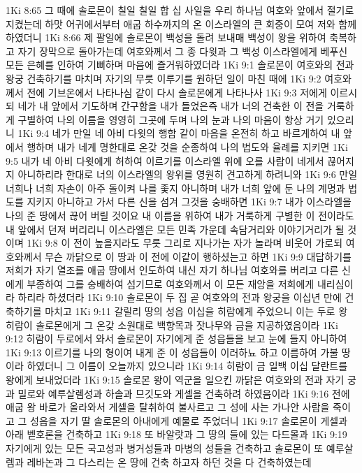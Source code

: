 1Ki 8:65  그 때에 솔로몬이 칠일 칠일 합 십 사일을 우리 하나님 여호와 앞에서 절기로 지켰는데 하맛 어귀에서부터 애굽 하수까지의 온 이스라엘의 큰 회중이 모여 저와 함께 하였더니
1Ki 8:66  제 팔일에 솔로몬이 백성을 돌려 보내매 백성이 왕을 위하여 축복하고 자기 장막으로 돌아가는데 여호와께서 그 종 다윗과 그 백성 이스라엘에게 베푸신 모든 은혜를 인하여 기뻐하며 마음에 즐거워하였더라
1Ki 9:1  솔로몬이 여호와의 전과 왕궁 건축하기를 마치며 자기의 무릇 이루기를 원하던 일이 마친 때에
1Ki 9:2  여호와께서 전에 기브온에서 나타나심 같이 다시 솔로몬에게 나타나사
1Ki 9:3  저에게 이르시되 네가 내 앞에서 기도하며 간구함을 내가 들었은즉 내가 너의 건축한 이 전을 거룩하게 구별하여 나의 이름을 영영히 그곳에 두며 나의 눈과 나의 마음이 항상 거기 있으리니
1Ki 9:4  네가 만일 네 아비 다윗의 행함 같이 마음을 온전히 하고 바르게하여 내 앞에서 행하며 내가 네게 명한대로 온갖 것을 순종하여 나의 법도와 율례를 지키면
1Ki 9:5  내가 네 아비 다윗에게 허하여 이르기를 이스라엘 위에 오를 사람이 네게서 끊어지지 아니하리라 한대로 너의 이스라엘의 왕위를 영원히 견고하게 하려니와
1Ki 9:6  만일 너희나 너희 자손이 아주 돌이켜 나를 좇지 아니하며 내가 너희 앞에 둔 나의 계명과 법도를 지키지 아니하고 가서 다른 신을 섬겨 그것을 숭배하면
1Ki 9:7  내가 이스라엘을 나의 준 땅에서 끊어 버릴 것이요 내 이름을 위하여 내가 거룩하게 구별한 이 전이라도 내 앞에서 던져 버리리니 이스라엘은 모든 민족 가운데 속담거리와 이야기거리가 될 것이며
1Ki 9:8  이 전이 높을지라도 무릇 그리로 지나가는 자가 놀라며 비웃어 가로되 여호와께서 무슨 까닭으로 이 땅과 이 전에 이같이 행하셨는고 하면
1Ki 9:9  대답하기를 저희가 자기 열조를 애굽 땅에서 인도하여 내신 자기 하나님 여호와를 버리고 다른 신에게 부종하여 그를 숭배하여 섬기므로 여호와께서 이 모든 재앙을 저희에게 내리심이라 하리라 하셨더라
1Ki 9:10  솔로몬이 두 집 곧 여호와의 전과 왕궁을 이십년 만에 건축하기를 마치고
1Ki 9:11  갈릴리 땅의 성읍 이십을 히람에게 주었으니 이는 두로 왕 히람이 솔로몬에게 그 온갖 소원대로 백향목과 잣나무와 금을 지공하였음이라
1Ki 9:12  히람이 두로에서 와서 솔로몬이 자기에게 준 성읍들을 보고 눈에 들지 아니하여
1Ki 9:13  이르기를 나의 형이여 내게 준 이 성읍들이 이러하뇨 하고 이름하여 가불 땅이라 하였더니 그 이름이 오늘까지 있으니라
1Ki 9:14  히람이 금 일백 이십 달란트를 왕에게 보내었더라
1Ki 9:15  솔로몬 왕이 역군을 일으킨 까닭은 여호와의 전과 자기 궁과 밀로와 예루살렘성과 하솔과 므깃도와 게셀을 건축하려 하였음이라
1Ki 9:16  전에 애굽 왕 바로가 올라와서 게셀을 탈취하여 불사르고 그 성에 사는 가나안 사람을 죽이고 그 성읍을 자기 딸 솔로몬의 아내에게 예물로 주었더니
1Ki 9:17  솔로몬이 게셀과 아래 벧호론을 건축하고
1Ki 9:18  또 바알랏과 그 땅의 들에 있는 다드몰과
1Ki 9:19  자기에게 있는 모든 국고성과 병거성들과 마병의 성들을 건축하고 솔로몬이 또 예루살렘과 레바논과 그 다스리는 온 땅에 건축 하고자 하던 것을 다 건축하였는데
